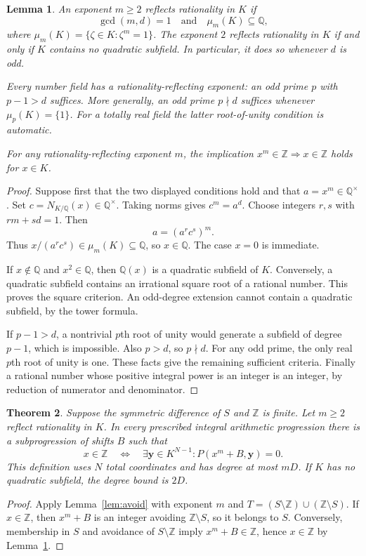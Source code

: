 \documentclass[11pt,a4paper]{article}
\newtheorem{theorem}{Theorem}[section]
\newtheorem{lemma}[theorem]{Lemma}
\newcommand{\Q}{\mathbb Q}\newcommand{\Z}{\mathbb Z}
\begin{document}
\begin{lemma}\label{lem:power-rationality}
An exponent $m\ge2$ reflects rationality in $K$ if
\[
       \gcd(m,d)=1\quad\text{and}\quad \mu_m(K)\subseteq\Q,
\]
where $\mu_m(K)=\{\zeta\in K:\zeta^m=1\}$.
The exponent $2$ reflects rationality in $K$ if and only if
$K$ contains no quadratic subfield. In particular, it does so
whenever $d$ is odd.

Every number field has a rationality-reflecting exponent: an odd
prime $p$ with $p-1>d$ suffices. More generally, an odd prime
$p\nmid d$ suffices whenever $\mu_p(K)=\{1\}$. For a totally
real field the latter root-of-unity condition is automatic.

For any rationality-reflecting exponent $m$, the implication
$x^m\in\Z\Rightarrow x\in\Z$ holds for $x\in K$.
\end{lemma}
\begin{proof}
Suppose first that the two displayed conditions hold and that
$a=x^m\in\Q^\times$. Set $c=N_{K/\Q}(x)\in\Q^\times$.
Taking norms gives $c^m=a^d$. Choose integers $r,s$ with
$rm+sd=1$. Then
\[
                       a=(a^r c^s)^m.
\]
Thus $x/(a^rc^s)\in\mu_m(K)\subseteq\Q$, so $x\in\Q$.
The case $x=0$ is immediate.

If $x\notin\Q$ and $x^2\in\Q$, then $\Q(x)$ is a quadratic
subfield of $K$. Conversely, a quadratic subfield contains an
irrational square root of a rational number. This proves the
square criterion. An odd-degree extension cannot contain a
quadratic subfield, by the tower formula.

If $p-1>d$, a nontrivial $p$th root of unity would generate a
subfield of degree $p-1$, which is impossible. Also $p>d$, so
$p\nmid d$. For any odd prime, the only real $p$th root of
unity is one. These facts give the remaining sufficient criteria.
Finally a rational number whose positive integral power is an
integer is an integer, by reduction of numerator and denominator.
\end{proof}

\begin{theorem}\label{thm:Z}
Suppose the symmetric difference of $S$ and $\Z$ is finite.
Let $m\ge2$ reflect rationality in $K$. In every prescribed integral
arithmetic progression there is a subprogression of shifts $B$
such that
\[
 x\in\Z\quad\Longleftrightarrow\quad
 \exists\mathbf y\in K^{N-1}:P(x^m+B,\mathbf y)=0.
\]
This definition uses $N$ total coordinates and has degree at most
$mD$. If $K$ has no quadratic subfield, the degree bound is $2D$.
\end{theorem}
\begin{proof}
Apply Lemma~\ref{lem:avoid} with exponent $m$ and
$T=(S\setminus\Z)\cup(\Z\setminus S)$. If $x\in\Z$, then
$x^m+B$ is an integer avoiding $\Z\setminus S$, so it belongs
to $S$. Conversely, membership in $S$ and avoidance of
$S\setminus\Z$ imply $x^m+B\in\Z$, hence $x\in\Z$ by
Lemma~\ref{lem:power-rationality}.
\end{proof}
\end{document}

